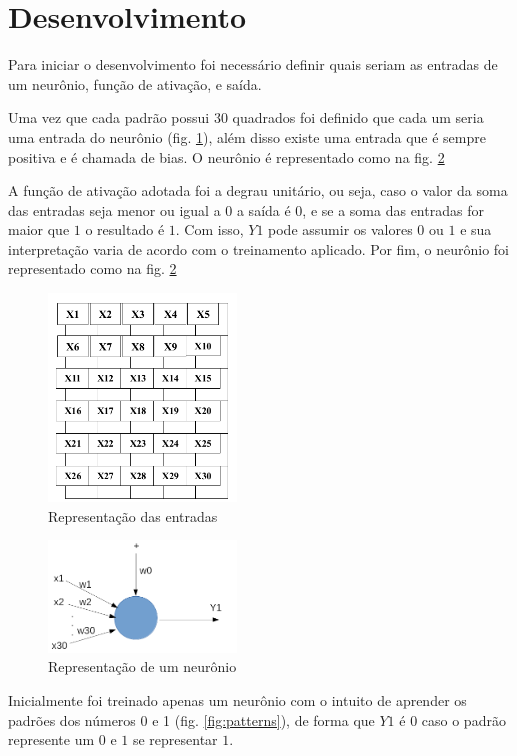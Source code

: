 \documentclass[11pt]{article}
\begin{document}
\section{Desenvolvimento}
\label{sec:desen}
Para iniciar o desenvolvimento foi necessário definir quais seriam as entradas
de um neurônio, função de ativação, e saída.

Uma vez que cada padrão possui 30 quadrados foi definido que cada um seria uma
entrada do neurônio (fig. \ref{fig:matriz}), além disso existe uma entrada que é
sempre positiva e é chamada de bias. O neurônio é representado como na
fig. \ref{fig:neuron}

A função de ativação adotada foi a degrau unitário, ou seja, caso o valor da soma das
entradas seja menor ou igual a $0$ a saída é $0$, e se a soma das entradas for maior que $1$
o resultado é $1$. Com isso, $Y1$ pode assumir os valores $0$ ou $1$ e sua
interpretação varia de acordo com o treinamento aplicado. Por fim, o neurônio foi
representado como na fig. \ref{fig:neuron}

\begin{figure}[h]
  \centering
  \includegraphics[width=5cm]{matriz.png}
  \caption{Representação das entradas}
  \label{fig:matriz}
\end{figure}

\begin{figure}[h]
  \centering
  \includegraphics[width=5cm]{neuron.png}
  \caption{Representação de um neurônio}
  \label{fig:neuron}
\end{figure}

Inicialmente foi treinado apenas um neurônio com o intuito de
aprender os padrões dos números 0 e 1 (fig. \ref{fig:patterns}), de forma que
$Y1$ é $0$ caso o padrão represente um $0$ e $1$ se representar $1$.
\end{document}
